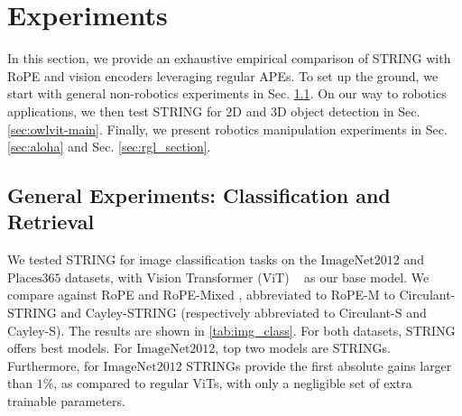 \vspace{-3mm}
\section{Experiments} 
\label{sec:experiments}
In this section, we provide an exhaustive empirical comparison of STRING with RoPE and vision encoders leveraging regular APEs. To set up the ground, we start with general non-robotics experiments in Sec. \ref{sec:general_experiments}. On our way to robotics applications, we then test STRING for 2D and 3D object detection in Sec. \ref{sec:owlvit-main}. Finally, we present robotics manipulation experiments in Sec. \ref{sec:aloha} and Sec. \ref{sec:rgl_section}.


\subsection{General Experiments: Classification and Retrieval}
\label{sec:general_experiments}
We tested STRING for image classification tasks on the $\mathrm{ImageNet2012}$ \cite{imagenet} and $\mathrm{Places365}$ datasets, with Vision Transformer (ViT) ~\cite{dosovitskiy2020vit} as our base model. We compare against RoPE and RoPE-Mixed \citep{heo2025rotary}, abbreviated to RoPE-M to Circulant-STRING and Cayley-STRING (respectively abbreviated to Circulant-S and Cayley-S). The results are shown in \cref{tab:img_class}. For both datasets, STRING offers best models. For $\mathrm{ImageNet2012}$, top two models are STRINGs. Furthermore, for $\mathrm{ImageNet2012}$ STRINGs provide the first absolute gains larger than $1\%$, as compared to regular ViTs, with only a negligible set of extra trainable parameters.

